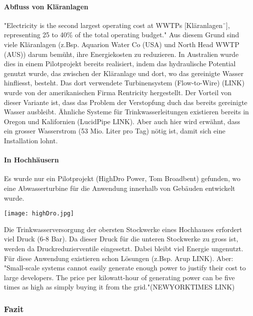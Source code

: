 \paragraph{Abfluss von Kläranlagen}
"Electricity is the second largest operating cost at WWTPs [Kläranlagen¨], representing 25 to 40\% of the total operating budget."
Aus diesem Grund sind viele Kläranlagen (z.Bsp. Aquarion Water Co (USA) und North Head WWTP (AUS)) darum bemüht, ihre Energiekosten zu reduzieren. In Australien wurde dies in einem Pilotprojekt bereits realisiert, indem das hydraulische Potential genutzt wurde, das zwischen der Kläranlage und dort, wo das gereinigte Wasser hinfliesst, besteht. Das dort verwendete Turbinensystem (Flow-to-Wire) (LINK) wurde von der amerikanischen Firma Rentricity hergestellt. Der Vorteil von dieser Variante ist, dass das Problem der Verstopfung duch das bereits gereinigte Wasser ausbleibt.
Ähnliche Systeme für Trinkwasserleitungen existieren bereits in Oregon und Kalifornien (LucidPipe LINK). Aber auch hier wird erwähnt, dass ein grosser Wasserstrom (53 Mio. Liter pro Tag) nötig ist, damit sich eine Installation lohnt.
\paragraph{In Hochhäusern}
Es wurde nur ein Pilotprojekt (HighDro Power, Tom Broadbent) gefunden, wo eine Abwasserturbine für die Anwendung innerhalb von Gebäuden entwickelt wurde.
\begin{center}
\texttt{[image: highDro.jpg]}
\end{center}
Die Trinkwasserversorgung der obersten Stockwerke eines Hochhauses erfordert viel Druck (6-8 Bar). Da dieser Druck für die unteren Stockwerke zu gross ist, werden da Druckreduzierventile eingesetzt. Dabei bleibt viel Energie ungenutzt. Für diese Anwendung existieren schon Lösungen (z.Bsp. Arup LINK). Aber:
"Small-scale systems cannot easily generate enough power to justify their cost to large developers. The price per kilowatt-hour of generating power can be five times as high as simply buying it from the grid."(NEWYORKTIMES LINK)
\subsubsection{Fazit}
\clearpage 
